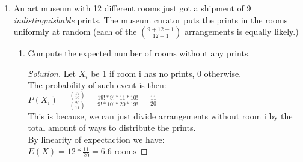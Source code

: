 \documentclass[10pt,letterpaper,unboxed,cm]{article}
\newenvironment{solution}
  {\begin{proof}[Solution]}
  {\end{proof}}
\begin{document}
\begin{enumerate}
\begin{enumerate}
\begin{enumerate}
\item
Compute the expected number of rooms with exactly 1 painting.

\begin{solution}
    
    Let $X_i$ be 1 if room has exactly one painting, 0 otherwise.\\
    \(P(X_i) = 9*\frac{1}{12}*(\frac{11}{12})^8\)\\
    This is true because any one of the 9 paintings can be the one in room i, it lands there with probability $\frac{1}{12}$, and the other 8 miss: $(\frac{11}{12})^8$ \\
    Now by linearity the expected number of rooms with exactly one painting comes to be:\\
    \(E(X) = 12*9*\frac{1}{12}*(\frac{11}{12})^8 \approx \boxed{4.49\text{ rooms}}\)\\
    Because we have 12 rooms and 9 paintings.

\end{solution}

\end{enumerate}


\item
An art museum with 12 different rooms just got a shipment of 9 \emph{indistinguishable} prints. The museum curator puts the prints in the rooms uniformly at random (each of the ${9 + 12-1 \choose 12-1}$ arrangements is equally likely.)

\begin{enumerate}
\item
Compute the expected number of rooms without any prints.

\begin{solution}
    
    Let $X_i$ be 1 if room i has no prints, 0 otherwise.\\
    The probability of such event is then:\\
    \(P(X_i) = \frac{\binom{19}{10}}{\binom{20}{11}} = \frac{19!*9!*11*10!}{9!*10!*20*19!} = \frac{11}{20}\)\\
    This is because, we can just divide arrangements without room i by the total amount of ways to distribute the prints.\\
    By linearity of expectaction we have:\\
    \(E(X) = 12 * \frac{11}{20} = \boxed{6.6 \text{ rooms}}\)

\end{solution}


\end{enumerate}
\end{enumerate}
\end{enumerate}
\end{document}
